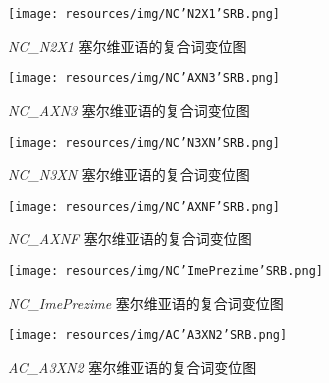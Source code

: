 \begin{figure}[!htb]
  \centering
  \texttt{[image: resources/img/NC'N2X1'SRB.png]}
  \caption{\emph{NC\_N2X1} 塞尔维亚语的复合词变位图}
  \label{fig:NC'N2X1'SRB}
\end{figure}

\begin{figure}[!htb]
  \centering
  \texttt{[image: resources/img/NC'AXN3'SRB.png]}
  \caption{\emph{NC\_AXN3} 塞尔维亚语的复合词变位图}
  \label{fig:NC'AXN3'SRB}
\end{figure}

\begin{figure}[!htb]
  \centering
  \texttt{[image: resources/img/NC'N3XN'SRB.png]}
  \caption{\emph{NC\_N3XN} 塞尔维亚语的复合词变位图}
  \label{fig:NC'N3XN'SRB}
\end{figure}

\begin{figure}[!htb]
  \centering
  \texttt{[image: resources/img/NC'AXNF'SRB.png]}
  \caption{\emph{NC\_AXNF} 塞尔维亚语的复合词变位图}
  \label{fig:NC'AXNF'SRB}
\end{figure}

\begin{figure}[!htb]
  \centering
  \texttt{[image: resources/img/NC'ImePrezime'SRB.png]}
  \caption{\emph{NC\_ImePrezime} 塞尔维亚语的复合词变位图}
  \label{fig:NC'ImePrezime'SRB}
\end{figure}

\begin{figure}[!htb]
  \centering
  \texttt{[image: resources/img/AC'A3XN2'SRB.png]}
  \caption{\emph{AC\_A3XN2} 塞尔维亚语的复合词变位图}
  \label{fig:AC'A3XN2'SRB}
\end{figure}

